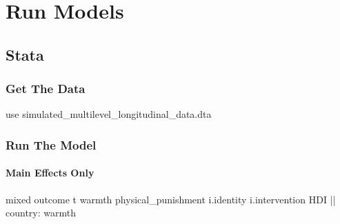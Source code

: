 \documentclass[
  letterpaper,
  DIV=11,
  numbers=noendperiod]{scrreprt}
\let\oldparagraph\paragraph
\renewcommand{\paragraph}[1]{\oldparagraph{#1}\mbox{}}
\newenvironment{Shaded}{\begin{snugshade}}{\end{snugshade}}
\newcommand{\KeywordTok}[1]{\textcolor[rgb]{0.00,0.23,0.31}{#1}}
\newcommand{\NormalTok}[1]{\textcolor[rgb]{0.00,0.23,0.31}{#1}}
\begin{document}
\section{Run Models}\label{run-models-2}

\subsection{Stata}

\subsubsection{Get The Data}\label{get-the-data-3}

\begin{Shaded}
\begin{Highlighting}[]

\KeywordTok{use}\NormalTok{ simulated\_multilevel\_longitudinal\_data.dta}
\end{Highlighting}
\end{Shaded}

\subsubsection{Run The Model}\label{run-the-model-3}

\paragraph{Main Effects Only}\label{main-effects-only}

\begin{Shaded}
\begin{Highlighting}[]
\NormalTok{mixed outcome t warmth physical\_punishment i.}\KeywordTok{identity}\NormalTok{ i.intervention HDI || country: warmth}
\end{Highlighting}
\end{Shaded}
\end{document}
